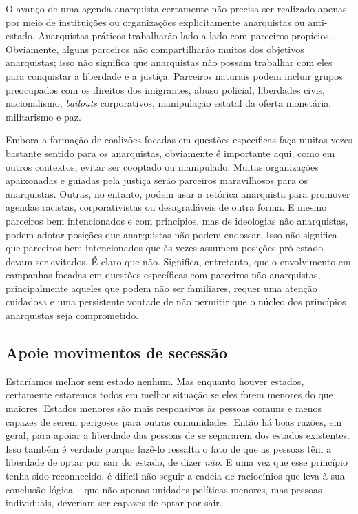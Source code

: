 O avanço de uma agenda anarquista certamente não precisa ser realizado apenas por meio de instituições ou organizações explicitamente anarquistas ou anti-estado. Anarquistas práticos trabalharão lado a lado com parceiros propícios. Obviamente, alguns parceiros não compartilharão muitos dos objetivos anarquistas; isso não significa que anarquistas não possam trabalhar com eles para conquistar a liberdade e a justiça. Parceiros naturais podem incluir grupos preocupados com os direitos dos imigrantes, abuso policial, liberdades civis, nacionalismo, \emph{bailouts} corporativos, manipulação estatal da oferta monetária, militarismo e paz.

Embora a formação de coalizões focadas em questões específicas faça muitas vezes bastante sentido para os anarquistas, obviamente é importante aqui, como em outros contextos, evitar ser cooptado ou manipulado. Muitas organizações apaixonadas e guiadas pela justiça serão parceiros maravilhosos para os anarquistas. Outras, no entanto, podem usar a retórica anarquista para promover agendas racistas, corporativistas ou desagradáveis de outra forma. E mesmo parceiros bem intencionados e com princípios, mas de ideologias não anarquistas, podem adotar posições que anarquistas não podem endossar. Isso não significa que parceiros bem intencionados que às vezes assumem posições pró-estado devam ser evitados. É claro que não. Significa, entretanto, que o envolvimento em campanhas focadas em questões específicas com parceiros não anarquistas, principalmente aqueles que podem não ser familiares, requer uma atenção cuidadosa e uma persistente vontade de não permitir que o núcleo dos princípios anarquistas seja comprometido.

\subsection*{Apoie movimentos de secessão}

Estaríamos melhor sem estado nenhum. Mas enquanto houver estados, certamente estaremos todos em melhor situação se eles forem menores do que maiores. Estados menores são mais responsivos às pessoas comuns e menos capazes de serem perigosos para outras comunidades. Então há boas razões, em geral, para apoiar a liberdade das pessoas de se separarem dos estados existentes. Isso também é verdade porque fazê-lo ressalta o fato de que as pessoas têm a liberdade de optar por sair do estado, de dizer \emph{não}. E uma vez que esse princípio tenha sido reconhecido, é difícil não seguir a cadeia de raciocínios que leva à sua conclusão lógica -- que não apenas unidades políticas menores, mas pessoas individuais, deveriam ser capazes de optar por sair.

